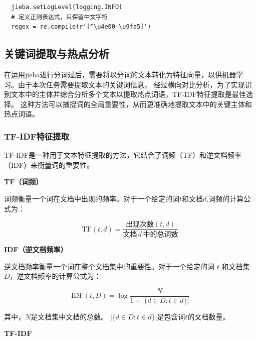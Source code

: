 \documentclass[UTF8,a4paper,15pt,titlepage,oneside]{ctexbook}
\begin{document}
\begin{mdframed}[backgroundcolor=darkgray, linecolor=lightgray, linewidth=1pt, innermargin=0.5cm, outermargin=0.5cm, skipbelow=0.1cm]
  \color{white}
  \begin{verbatim}
  jieba.setLogLevel(logging.INFO)
  # 定义正则表达式，只保留中文字符
  regex = re.compile(r'[^\u4e00-\u9fa5]')
  \end{verbatim}
  \vspace{-1.5em} %
  \end{mdframed}

\subsection{关键词提取与热点分析}

在运用jieba进行分词过后，需要将以分词的文本转化为特征向量，以供机器学习。由于本次任务需要提取文本的关键词信息，
经过横向对比分析，为了实现识别文本中的主体并综合分析多个文本以提取热点词语，TF-IDF特征提取是最佳选择。
这种方法可以捕捉词的全局重要性，从而更准确地提取文本中的关键主体和热点词语。

\subsubsection{TF-IDF特征提取}

TF-IDF是一种用于文本特征提取的方法，它结合了词频（TF）和逆文档频率（IDF）来衡量词的重要性。

\vskip 0.2cm
\noindent
\textbf{TF（词频）}

词频衡量一个词在文档中出现的频率。对于一个给定的词$t$和文档$d$,词频的计算公式为：

\begin{equation}
  \text{TF}(t, d) = \frac{\text{出现次数}(t, d)}{\text{文档}\, d\, \text{中的总词数}}
\end{equation}

\vskip 0.2cm
\noindent
\textbf{IDF（逆文档频率）}

逆文档频率衡量一个词在整个文档集中的重要性。对于一个给定的词 \( t \) 和文档集 \( D \)，逆文档频率的计算公式为：

\begin{equation}
\text{IDF}(t, D) = \log \frac{N}{1 + |\{d \in D : t \in d\}|}
\end{equation}

其中，$N$是文档集中文档的总数。
$|\{d \in D : t \in d\}|$是包含词$t$的文档数量。

\vskip 0.2cm
\noindent
\textbf{TF-IDF}
\end{document}
